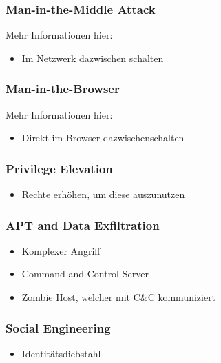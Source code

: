 \subsubsection{Man-in-the-Middle Attack}
Mehr Informationen hier: 
\begin{itemize}
    \item Im Netzwerk dazwischen schalten
\end{itemize}


\subsubsection{Man-in-the-Browser}
Mehr Informationen hier: 
\begin{itemize}
    \item Direkt im Browser dazwischenschalten
\end{itemize}


\subsubsection{Privilege Elevation}
\begin{itemize}
    \item Rechte erhöhen, um diese auszunutzen
\end{itemize}


\subsubsection{APT and Data Exfiltration}
\begin{itemize}
    \item Komplexer Angriff
    \item Command and Control Server
    \item Zombie Host, welcher mit C\&C kommuniziert
\end{itemize}

\subsubsection{Social Engineering}
\begin{itemize}
    \item Identitätsdiebstahl
\end{itemize}

\vfill
$ $
